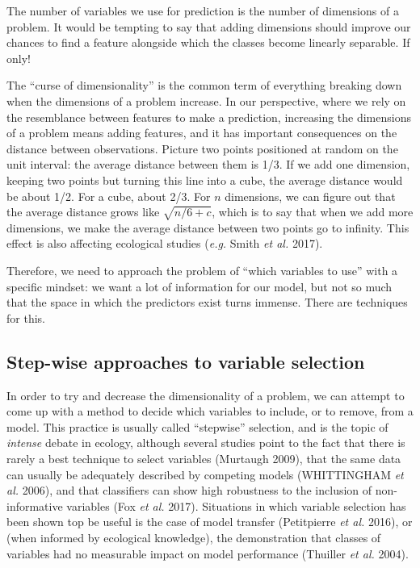 \documentclass[
  letterpaper,
]{scrbook}
\begin{document}
The number of variables we use for prediction is the number of
dimensions of a problem. It would be tempting to say that adding
dimensions should improve our chances to find a feature alongside which
the classes become linearly separable. If only!

The ``curse of dimensionality'' is the common term of everything
breaking down when the dimensions of a problem increase. In our
perspective, where we rely on the resemblance between features to make a
prediction, increasing the dimensions of a problem means adding
features, and it has important consequences on the distance between
observations. Picture two points positioned at random on the unit
interval: the average distance between them is 1/3. If we add one
dimension, keeping two points but turning this line into a cube, the
average distance would be about 1/2. For a cube, about 2/3. For \(n\)
dimensions, we can figure out that the average distance grows like
\(\sqrt{n/6 + c}\), which is to say that when we add more dimensions, we
make the average distance between two points go to infinity. This effect
is also affecting ecological studies (\emph{e.g.} Smith \emph{et al.}
2017).

Therefore, we need to approach the problem of ``which variables to use''
with a specific mindset: we want a lot of information for our model, but
not so much that the space in which the predictors exist turns immense.
There are techniques for this.

\subsection{Step-wise approaches to variable
selection}\label{step-wise-approaches-to-variable-selection}

In order to try and decrease the dimensionality of a problem, we can
attempt to come up with a method to decide which variables to include,
or to remove, from a model. This practice is usually called ``stepwise''
selection, and is the topic of \emph{intense} debate in ecology,
although several studies point to the fact that there is rarely a best
technique to select variables (Murtaugh 2009), that the same data can
usually be adequately described by competing models (WHITTINGHAM
\emph{et al.} 2006), and that classifiers can show high robustness to
the inclusion of non-informative variables (Fox \emph{et al.} 2017).
Situations in which variable selection has been shown top be useful is
the case of model transfer (Petitpierre \emph{et al.} 2016), or (when
informed by ecological knowledge), the demonstration that classes of
variables had no measurable impact on model performance (Thuiller
\emph{et al.} 2004).
\end{document}
